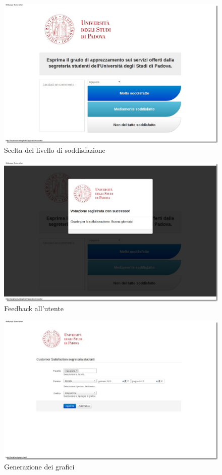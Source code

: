   \begin{figure}[!h]
    \begin{center}
        \includegraphics[scale=0.32]{icons/voting.png}
        \caption{Scelta del livello di soddisfazione}
        \label{fig:voting}
    \end{center}
  \end{figure}
  \begin{figure}[!h]
    \begin{center}
        \includegraphics[scale=0.32]{icons/stored.png}
        \caption{Feedback all'utente}
        \label{fig:stored}
    \end{center}
  \end{figure}
  \begin{figure}[!h]
    \begin{center}
        \includegraphics[scale=0.32]{icons/graph.png}
        \caption{Generazione dei grafici}
        \label{fig:graph}
    \end{center}
  \end{figure}
